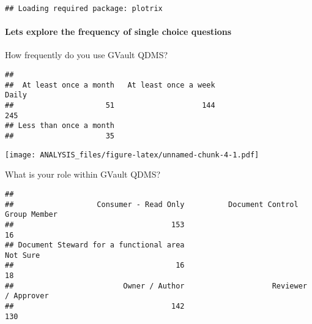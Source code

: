 \documentclass[]{article}
\newenvironment{Shaded}{\begin{snugshade}}{\end{snugshade}}
\newcommand{\KeywordTok}[1]{\textcolor[rgb]{0.13,0.29,0.53}{\textbf{#1}}}
\newcommand{\DataTypeTok}[1]{\textcolor[rgb]{0.13,0.29,0.53}{#1}}
\newcommand{\DecValTok}[1]{\textcolor[rgb]{0.00,0.00,0.81}{#1}}
\newcommand{\FloatTok}[1]{\textcolor[rgb]{0.00,0.00,0.81}{#1}}
\newcommand{\StringTok}[1]{\textcolor[rgb]{0.31,0.60,0.02}{#1}}
\newcommand{\OperatorTok}[1]{\textcolor[rgb]{0.81,0.36,0.00}{\textbf{#1}}}
\newcommand{\NormalTok}[1]{#1}
\let\oldparagraph\paragraph
\renewcommand{\paragraph}[1]{\oldparagraph{#1}\mbox{}}
\begin{document}
\begin{verbatim}
## Loading required package: plotrix
\end{verbatim}

\paragraph{Lets explore the frequency of single choice
questions}\label{lets-explore-the-frequency-of-single-choice-questions}

How frequently do you use GVault QDMS?

\begin{Shaded}
\end{Shaded}

\begin{verbatim}
## 
##  At least once a month   At least once a week                  Daily 
##                     51                    144                    245 
## Less than once a month 
##                     35
\end{verbatim}

\begin{Shaded}
\end{Shaded}

\texttt{[image: ANALYSIS\_files/figure-latex/unnamed-chunk-4-1.pdf]}

What is your role within GVault QDMS?

\begin{Shaded}
\end{Shaded}

\begin{verbatim}
## 
##                   Consumer - Read Only          Document Control Group Member 
##                                    153                                     16 
## Document Steward for a functional area                               Not Sure 
##                                     16                                     18 
##                         Owner / Author                    Reviewer / Approver 
##                                    142                                    130
\end{verbatim}
\end{document}
